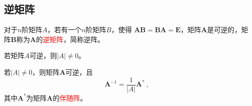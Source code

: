 \documentclass[12pt,a4paper]{article}
\renewcommand{\vec}[1]{\boldsymbol{#1}}
\begin{document}
\subsection{逆矩阵}
\begin{tcolorbox}[colback=green!5,colframe=green!40!black,title= 定义]
对于$n$阶矩阵$A$，若有一个$n$阶矩阵$B$，使得
$\vec{A B} = \vec{B A} = \vec{E}$，矩阵$\vec{A}$是可逆的，矩阵$\vec{B}$称为$\vec{A}$的\textcolor{red}{逆矩阵}，简称逆阵。
\end{tcolorbox}


\begin{tcolorbox}[colback=green!5,colframe=green!40!black,title= 定理]
若矩阵$A$可逆，则$|A| \neq 0$。
\end{tcolorbox}



\begin{tcolorbox}[colback=green!5,colframe=green!40!black,title= 定理]
若$|A| \neq 0$，则矩阵$\vec{A}$可逆，且
\begin{equation}
\vec{A}^{-1} = \dfrac{1}{|A|} \vec{A}^\ast ~,
\end{equation}
其中$\vec{A}^\ast$为矩阵$\vec{A}$的\textcolor{red}{伴随阵}。
\end{tcolorbox}
\end{document}
